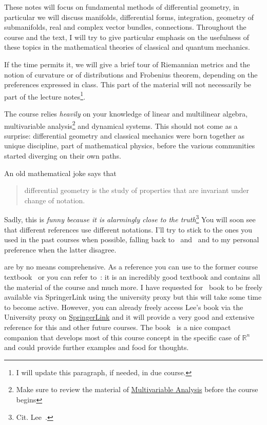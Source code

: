 \documentclass[nobib, a4paper]{tufte-book}
\theoremstyle{plain}
\theoremstyle{definition}
\theoremstyle{remark}
\newcommand{\R}{\mathbb{R}}
\begin{document}
These notes will focus on fundamental methods of differential geometry, in particular we will discuss manifolds, differential forms, integration, geometry of submanifolds, real and complex vector bundles, connections.
Throughout the course and the text, I will try to give particular emphasis on the usefulness of these topics in the mathematical theories of classical and quantum mechanics.

If the time permits it, we will give a brief tour of Riemannian metrics and the notion of curvature or of distributions and Frobenius theorem, depending on the preferences expressed in class.
This part of the material will not necessarily be part of the lecture notes\footnote{I will update this paragraph, if needed, in due course.}.

The course relies \emph{heavily} on your knowledge of linear and multilinear algebra, multivariable analysis\footnote{Make sure to review the material of \href{http://www.rolandvdv.nl/M19/}{Multivariable Analysis} before the course begins} and dynamical systems.
This should not come as a surprise: differential geometry and classical mechanics were born together as unique discipline, part of mathematical physics, before the various communities started diverging on their own paths.

An old mathematical joke says that
\begin{quote}
  differential geometry is the study of properties that are invariant under change of notation.
\end{quote}
Sadly, this is \emph{funny because it is alarmingly close to the truth}\footnote{Cit. Lee~\cite{book:lee}.}
You will soon see that different references use different notations. I'll try to stick to the ones you used in the past courses when possible, falling back to~\cite{book:lee} and~\cite{book:tu} and to my personal preference when the latter disagree.

 are by no means comprehensive.
As a reference you can use to the former course textbook~\cite{book:tu} or you can refer to~\cite{book:lee}: it is an incredibly good textbook and contains all the material of the course and much more.
I have requested for~\cite{book:tu} book to be freely available via SpringerLink using the university proxy but this will take some time to become active.
However, you can already freely access Lee's book via the University proxy on \href{https://link.springer.com/book/10.1007/978-1-4419-9982-5}{SpringerLink} and it will provide a very good and extensive reference for this and other future courses.
The book~\cite{book:McInerney} is a nice compact companion that develops most of this course concept in the specific case of $\R^n$ and could provide further examples and food for thoughts.
\end{document}
